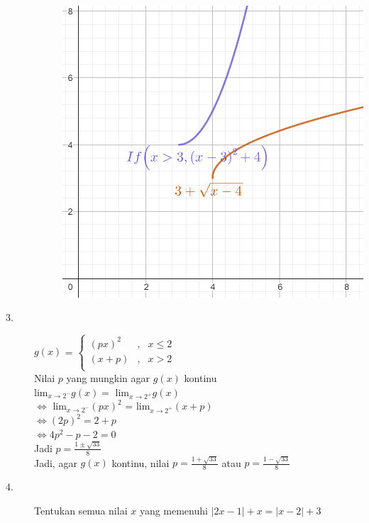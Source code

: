 \documentclass{article}
\begin{document}
\begin{description}
\begin{description}
    \item[] \begin{enumerate} \includegraphics[scale=0.25]{2.png}\end{enumerate}
    \end{description}
    \item[$3.$]$g(x)$ =  $\left\{ \begin{array}{rcl}
        (px)^2 & \mbox{,} & x \leq 2 \\ 
        (x+p) & \mbox{,} & x > 2 \\
        \end{array}\right.$ \\
    Nilai $p$ yang mungkin agar $g(x)$ kontinu \\
    lim$_{x\rightarrow2^-} g(x) =$  lim$_{x\rightarrow2^+} g(x)$ \\
    $\Leftrightarrow$ lim$_{x\rightarrow2^-} (px)^2$ =  lim$_{x\rightarrow2^+} (x+p)$ \\
    $\Leftrightarrow (2p)^2 = 2 + p$  \\
    $\Leftrightarrow 4p^2 - p -2 = 0$  \\
    Jadi $p = \frac{1 \pm \sqrt{33}}{8}$ \\
    Jadi, agar $g(x)$ kontinu, nilai $p = \frac{1 + \sqrt{33}}{8}$ atau $p = \frac{1 - \sqrt{33}}{8}$
    \item[$4.$] Tentukan semua nilai $x$ yang memenuhi $|2x-1| + x = |x-2| + 3$

\end{description}
\end{document}
